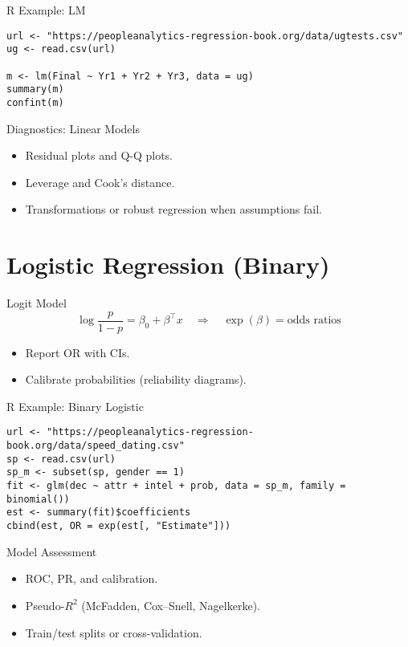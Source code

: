 \documentclass[aspectratio=169]{beamer}
\begin{document}
\begin{frame}[fragile]{R Example: LM}
\begin{lstlisting}[style=rcode]
url <- "https://peopleanalytics-regression-book.org/data/ugtests.csv"
ug <- read.csv(url)

m <- lm(Final ~ Yr1 + Yr2 + Yr3, data = ug)
summary(m)
confint(m)
\end{lstlisting}
\end{frame}

\begin{frame}{Diagnostics: Linear Models}
\begin{itemize}
  \item Residual plots and Q-Q plots.
  \item Leverage and Cook’s distance.
  \item Transformations or robust regression when assumptions fail.
\end{itemize}
\end{frame}

\section{Logistic Regression (Binary)}

\begin{frame}{Logit Model}
\[\log\frac{p}{1-p}=\beta_0+\beta^\top x \quad \Rightarrow \quad \exp(\beta)=\text{odds ratios}\]
\begin{itemize}
  \item Report OR with CIs.
  \item Calibrate probabilities (reliability diagrams).
\end{itemize}
\end{frame}

\begin{frame}[fragile]{R Example: Binary Logistic}
\begin{lstlisting}[style=rcode]
url <- "https://peopleanalytics-regression-book.org/data/speed_dating.csv"
sp <- read.csv(url)
sp_m <- subset(sp, gender == 1)
fit <- glm(dec ~ attr + intel + prob, data = sp_m, family = binomial())
est <- summary(fit)$coefficients
cbind(est, OR = exp(est[, "Estimate"]))
\end{lstlisting}
\end{frame}

\begin{frame}{Model Assessment}
\begin{itemize}
  \item ROC, PR, and calibration.
  \item Pseudo-$R^2$ (McFadden, Cox–Snell, Nagelkerke).
  \item Train/test splits or cross-validation.
\end{itemize}
\end{frame}
\end{document}

